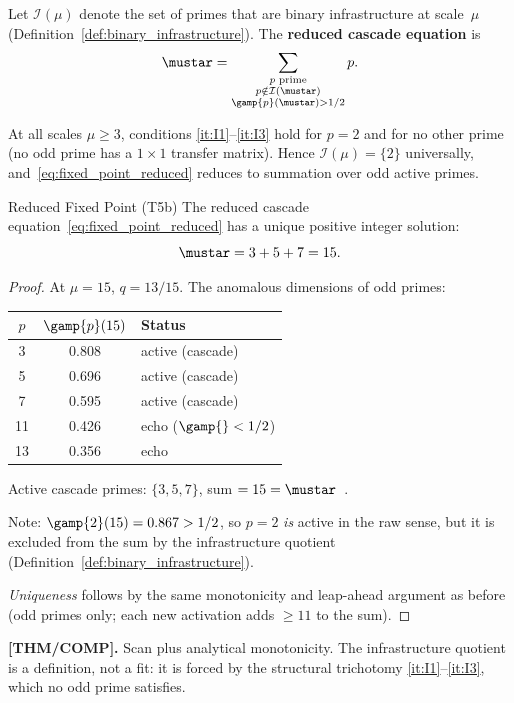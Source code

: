\documentclass[12pt,a4paper]{article}
\begin{document}
\begin{definition}
\label{def:cascade_eq}
Let $\mathcal{I}(\mu)$ denote the set of primes that are binary
infrastructure at scale~$\mu$ (Definition~\ref{def:binary_infrastructure}).
The \textbf{reduced cascade equation} is
\begin{equation}
  \mustar = \sum_{\substack{p \text{ prime} \\
  p \notin \mathcal{I}(\mustar) \\
  \gamp{p}(\mustar) > 1/2}} p.
  \label{eq:fixed_point_reduced}
\end{equation}
\end{definition}

At all scales $\mu \geq 3$, conditions \ref{it:I1}--\ref{it:I3} hold
for $p = 2$ and for no other prime (no odd prime has a $1 \times 1$
transfer matrix). Hence $\mathcal{I}(\mu) = \{2\}$ universally,
and~\eqref{eq:fixed_point_reduced} reduces to summation over odd
active primes.

\begin{thmbox}{Reduced Fixed Point (T5b)}
\label{thm:T5b}
\label{thm:T5} %
The reduced cascade equation~\eqref{eq:fixed_point_reduced} has a
unique positive integer solution:
\begin{equation}
  \mustar = 3 + 5 + 7 = 15.
  \label{eq:mustar_15}
\end{equation}

\begin{proof}
At $\mu = 15$, $q = 13/15$.  The anomalous dimensions of odd primes:
\begin{center}
\begin{tabular}{ccl}
\toprule
$p$ & $\gamp{p}(15)$ & Status \\
\midrule
3   & 0.808 & active (cascade) \\
5   & 0.696 & active (cascade) \\
7   & 0.595 & active (cascade) \\
11  & 0.426 & echo ($\gamp{} < 1/2$) \\
13  & 0.356 & echo \\
\bottomrule
\end{tabular}
\end{center}
Active cascade primes: $\{3,5,7\}$, sum $= 15 = \mustar$~\checkmark.

Note: $\gamp{2}(15) = 0.867 > 1/2$, so $p = 2$ \emph{is} active
in the raw sense, but it is excluded from the sum by the
infrastructure quotient (Definition~\ref{def:binary_infrastructure}).

\emph{Uniqueness} follows by the same monotonicity and leap-ahead
argument as before (odd primes only; each new activation adds
$\geq 11$ to the sum).
\end{proof}

\noindent\textbf{[THM/COMP].}\;
Scan plus analytical monotonicity.  The infrastructure quotient
is a definition, not a fit: it is forced by the structural
trichotomy \ref{it:I1}--\ref{it:I3}, which no odd prime satisfies.
\end{thmbox}
\end{document}
